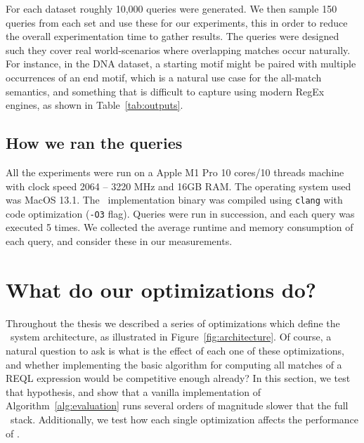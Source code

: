 For each dataset roughly 10,000 queries were generated. We then sample 150
queries from each set and use these for our experiments, this in order to reduce
the overall experimentation time to gather results. The queries were designed
such they cover real world-scenarios where overlapping matches occur naturally.
For instance, in the \textsf{DNA} dataset, a starting motif might be paired with
multiple occurrences of an end motif, which is a natural use case for the
all-match semantics, and something that is difficult to capture using modern
RegEx engines, as shown in Table~\ref{tab:outputs}. 


\subsection{How we ran the queries}
All the experiments were run on a Apple M1 Pro 10 cores/10 threads machine with
clock speed 2064 -- 3220 MHz and 16GB RAM. The operating system used was MacOS
13.1.   The \rematch\ implementation binary was compiled using \texttt{clang}
with code optimization (\texttt{-O3} flag). Queries were run in succession, and
each query was executed 5 times. We collected the average runtime and memory
consumption of each query, and consider these in our measurements.

\section{What do our optimizations do?}\label{ss:internal} Throughout the thesis
we described a series of optimizations which define the \rematch\ system
architecture, as illustrated in Figure~\ref{fig:architecture}. Of course, a
natural question to ask is what is the effect of each one of these
optimizations, and whether implementing the basic algorithm for computing all
matches of a REQL expression  would be competitive enough already? In this
section, we test that hypothesis, and show that a vanilla implementation of
Algorithm~\ref{alg:evaluation} runs several orders of magnitude slower that the
full \rematch\ stack. Additionally, we test how each single optimization affects
the performance of \rematch.




